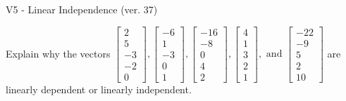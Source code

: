 \begin{exercise}
  \begin{exerciseTitle}V5 - Linear Independence (ver. 37)\end{exerciseTitle}
  \begin{exerciseStatement}
    Explain why the vectors \(\left[\begin{array}{r}
2 \\
5 \\
-3 \\
-2 \\
0
\end{array}\right] , \left[\begin{array}{r}
-6 \\
1 \\
-3 \\
0 \\
1
\end{array}\right] , \left[\begin{array}{r}
-16 \\
-8 \\
0 \\
4 \\
2
\end{array}\right] , \left[\begin{array}{r}
4 \\
1 \\
3 \\
2 \\
1
\end{array}\right] , \text{ and } \left[\begin{array}{r}
-22 \\
-9 \\
5 \\
2 \\
10
\end{array}\right]\) are linearly dependent or linearly independent.	



\end{exerciseStatement}
\end{exercise}
